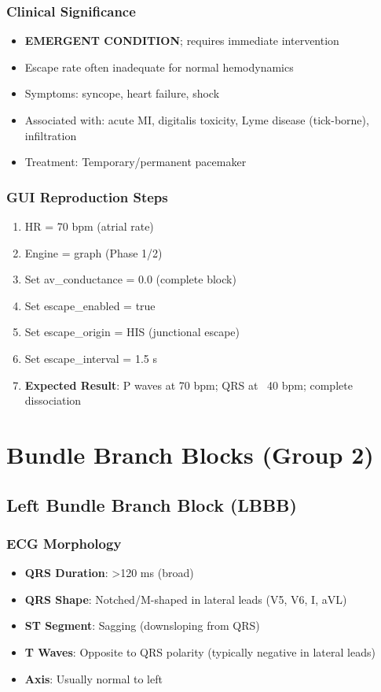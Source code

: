 \documentclass[11pt, a4paper]{article}
\begin{document}
\subsubsection{Clinical Significance}
\begin{itemize}
    \item \textbf{EMERGENT CONDITION}; requires immediate intervention
    \item Escape rate often inadequate for normal hemodynamics
    \item Symptoms: syncope, heart failure, shock
    \item Associated with: acute MI, digitalis toxicity, Lyme disease (tick-borne), infiltration
    \item Treatment: Temporary/permanent pacemaker
\end{itemize}

\subsubsection{GUI Reproduction Steps}
\begin{enumerate}
    \item HR = 70 bpm (atrial rate)
    \item Engine = graph (Phase 1/2)
    \item Set av\_conductance = 0.0 (complete block)
    \item Set escape\_enabled = true
    \item Set escape\_origin = HIS (junctional escape)
    \item Set escape\_interval = 1.5 s
    \item \textbf{Expected Result}: P waves at 70 bpm; QRS at ~40 bpm; complete dissociation
\end{enumerate}

\section{Bundle Branch Blocks (Group 2)}

\subsection{Left Bundle Branch Block (LBBB)}

\subsubsection{ECG Morphology}
\begin{itemize}
    \item \textbf{QRS Duration}: >120 ms (broad)
    \item \textbf{QRS Shape}: Notched/M-shaped in lateral leads (V5, V6, I, aVL)
    \item \textbf{ST Segment}: Sagging (downsloping from QRS)
    \item \textbf{T Waves}: Opposite to QRS polarity (typically negative in lateral leads)
    \item \textbf{Axis}: Usually normal to left
\end{itemize}
\end{document}
